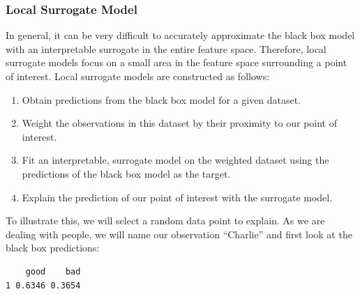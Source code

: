 \hypertarget{local-surrogate-model}{%
\subsubsection{Local Surrogate Model}\label{local-surrogate-model}}

In general, it can be very difficult to
accurately approximate the black box model with an interpretable
surrogate in the entire feature space. Therefore, local surrogate models
focus on a small area in the feature space surrounding a point of
interest. Local surrogate models are constructed as follows:

\begin{enumerate}
\def\labelenumi{\arabic{enumi}.}
\tightlist
\item
  Obtain predictions from the black box model for a given dataset.
\item
  Weight the observations in this dataset by their proximity to our
  point of interest.
\item
  Fit an interpretable, surrogate model on the weighted dataset using
  the predictions of the black box model as the target.
\item
  Explain the prediction of our point of interest with the surrogate
  model.
\end{enumerate}

To illustrate this, we will select a random data point to explain. As we
are dealing with people, we will name our observation ``Charlie'' and
first look at the black box predictions:

\begin{Shaded}
\begin{Highlighting}[]
\OtherTok{=}\NormalTok{ credit\_x[}\NormalTok{, ]}
\OtherTok{=}\SpecialCharTok{$}
\end{Highlighting}
\end{Shaded}

\begin{verbatim}
    good    bad
1 0.6346 0.3654
\end{verbatim}

